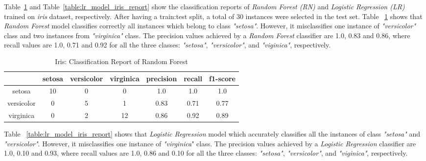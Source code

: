 \documentclass[english]{tktltiki2}
\theoremstyle{definition}
\theoremstyle{remark}
\begin{document}
Table~\ref{table:rf_model_iris_report} and Table~\ref{table:lr_model_iris_report} show the classification reports of 
\textit{Random Forest (RN)} and \textit{Logistic Regression (LR)} trained on \textit{iris} dataset, respectively. After having a train:test split, a total of 30 instances were selected in the test set. Table ~\ref{table:rf_model_iris_report} shows that \textit{Random Forest} model classifies correctly all instances which belong to class \textit{"setosa"}. However, it misclassifies one instance of \textit{"versicolor"} class and two instances from \textit{"virginica"} class. The precision values achieved by a \textit{Random Forest} classifier are 1.0, 0.83 and 0.86, where recall values are 1.0, 0.71 and 0.92 for all the three classes: \textit{"setosa"}, \textit{"versicolor"}, and \textit{"viginica"}, respectively.  

\begin{table}[H]
	\centering
	\caption{Iris: Classification Report of Random Forest}
	\label{table:rf_model_iris_report}
	\begin{tabular}{@{}ccccccc@{}}
		\toprule
		& setosa & versicolor & virginica & precision & recall & f1-score \\ \hline
		
		\multicolumn{1}{|c|}{setosa} & \multicolumn{1}{c|}{10} & \multicolumn{1}{c|}{0} & \multicolumn{1}{c|}{0} & \multicolumn{1}{c|}{1.0} & \multicolumn{1}{c|}{1.0} & \multicolumn{1}{c|}{1.0} \\ \hline
		
		\multicolumn{1}{|c|}{versicolor} & \multicolumn{1}{c|}{0} & \multicolumn{1}{c|}{5} & \multicolumn{1}{c|}{1} & \multicolumn{1}{c|}{0.83} & \multicolumn{1}{c|}{0.71} & \multicolumn{1}{c|}{0.77} \\ \hline
		
		\multicolumn{1}{|c|}{virginica} & \multicolumn{1}{c|}{0} & \multicolumn{1}{c|}{2} & \multicolumn{1}{c|}{12} & \multicolumn{1}{c|}{0.86} & \multicolumn{1}{c|}{0.92} & \multicolumn{1}{c|}{0.89} \\ \hline

	\end{tabular}
\end{table}

Table ~\ref{table:lr_model_iris_report} shows that \textit{Logistic Regression} model which accurately classifies all the instances of class \textit{"setosa"} and \textit{"versicolor"}. However, it misclassifies one instance of \textit{"virginica}" class. The precision values achieved by a \textit{Logistic Regression} classifier are 1.0, 0.10 and 0.93, where recall values are 1.0, 0.86 and 0.10 for all the three classes: \textit{"setosa"}, \textit{"versicolor"}, and \textit{"viginica"}, respectively.
\end{document}
